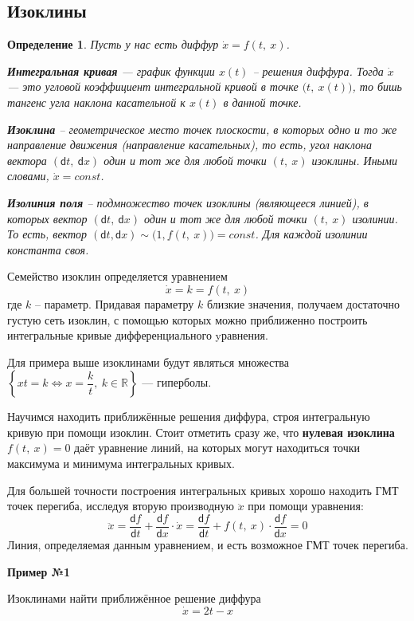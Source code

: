 \documentclass[a4paper,12pt]{article}
\newtheorem{definition}{Определение}
\newcommand{\R}{\mathbb{R}}
\renewcommand{\d}{\mathsf{d}}
\newcommand{\dx}{\dot{x}}
\newcommand{\ddx}{\ddot{x}}
\begin{document}
\subsection{Изоклины}

\begin{definition}
	Пусть у нас есть диффур $\dx = f(t,\ x)$.
	
	\textbf{Интегральная кривая} --- график функции $x(t)$ -- решения диффура. Тогда $\dx$ --- это угловой коэффициент интегральной кривой в точке $\big(t,\ x(t)\big)$, то бишь тангенс угла наклона касательной к $x(t)$ в данной точке.
	
	\textbf{Изоклина} -- геометрическое место точек плоскости, в которых одно и то же направление движения (направление касательных), то есть, угол наклона вектора $(\d t,\ \d x)$ один и тот же для любой точки $(t,\ x)$ изоклины. Иными словами, $\dx = const$.
	
	\textbf{Изолиния поля} -- подмножество точек изоклины (являющееся линией), в которых вектор $(\d t,\ \d x)$ один и тот же для любой точки  $(t,\ x)$ изолинии. То есть, вектор $(\d t, \d x) \sim \big(1, f(t,\ x)\big) = const$. Для каждой изолинии константа своя.
\end{definition}

Семейство изоклин определяется уравнением
\[\dx = k = f(t,\ x)\] где $k$ -- параметр. Придавая параметру $k$ близкие значения, получаем достаточно густую сеть изоклин, с помощью которых можно приближенно построить интегральные кривые дифференциального yравнения.

Для примера выше изоклинами будут являться множества $\left\{xt = k \iff x = \dfrac{k}{t},\ k \in \R\right\}$ --- гиперболы.

Научимся находить приближённые решения диффура, строя интегральную кривую при помощи изоклин. Стоит отметить сразу же, что \textbf{нулевая изоклина} $f(t,\ x) = 0$ даёт уравнение линий, на которых могут находиться точки максимума и минимума интегральных кривых.

Для большей точности построения интегральных кривых хорошо находить ГМТ точек перегиба, исследуя вторую производную $\ddx$ при помощи уравнения:
\[\ddx = \dfrac{\d f}{\d t} + \dfrac{\d f}{\d x}\cdot \dx = \dfrac{\d f}{\d t} + f(t,\ x) \cdot \dfrac{\d f}{\d x} = 0\]
Линия, определяемая данным уравнением, и есть возможное ГМТ точек перегиба.

\textbf{Пример №1}

Изоклинами найти приближённое решение диффура
\[\dx = 2t - x\]
\end{document}
